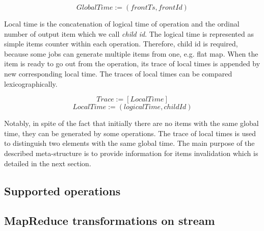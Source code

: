 \[GlobalTime := (frontTs, frontId)\]

Local time is the concatenation of logical time of operation and the ordinal number of output item which we call {\it child id}. The logical time is represented as simple items counter within each operation. Therefore, child id is required, because some jobs can generate multiple items from one, e.g. flat map. When the item is ready to go out from the operation, its trace of local times is appended by new corresponding local time. The traces of local times can be compared lexicographically.

\[Trace := [LocalTime]\]
\[LocalTime := (logicalTime, childId)\]

Notably, in spite of the fact that initially there are no items with the same global time, they can be generated by some operations. The trace of local times is used to distinguish two elements with the same global time. The main purpose of the described meta-structure is to provide information for items invalidation which is detailed in the next section.

\subsection{Supported operations}

\subsection{MapReduce transformations on stream}





